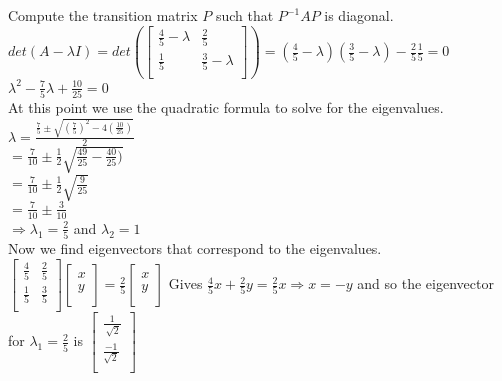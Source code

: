 \documentclass[12pt]{article}
\newenvironment{problems}{\begin{list}{}{\setlength{\labelwidth}{.7in}}}{\end{list}}
\begin{document}
\begin{problems}
 Compute the transition matrix $P$ such that $P^{-1}AP$ is diagonal.\\
 $det(A -\lambda I) = det\left(
 \begin{bmatrix}
   \frac{4}{5} - \lambda & \frac{2}{5} \\
   \frac{1}{5} & \frac{3}{5} - \lambda \\
  \end{bmatrix}\right) =
 (\frac{4}{5} - \lambda)(\frac{3}{5} - \lambda) - \frac{2}{5}\frac{1}{5} =0$\\
 $\lambda^2 -\frac{7}{5}\lambda +\frac{10}{25} = 0$\\
 At this point we use the quadratic formula to solve for the eigenvalues.\\
 $\lambda =   \frac{    \frac{7}{5}\pm \sqrt{(\frac{7}{5})^2 -4(\frac{10}{25})     }       }{  2        }$\\
  $ = \frac{7}{10} \pm \frac{1}{2}\sqrt{\frac{49}{25} -\frac{40}{25})     }       $\\
   $ = \frac{7}{10} \pm \frac{1}{2}\sqrt{\frac{9}{25}    }       $\\
      $ = \frac{7}{10} \pm \frac{3}{10}      $\\
$ \Rightarrow \lambda_1 = \frac{2}{5}$ and $\lambda_2 = 1$\\
Now we find eigenvectors that correspond to the eigenvalues.\\
$\begin{bmatrix}
   \frac{4}{5} & \frac{2}{5} \\
   \frac{1}{5} & \frac{3}{5} \\
  \end{bmatrix} 
  \begin{bmatrix}
   x\\
   y\\
  \end{bmatrix} =
  \frac{2}{5}
  \begin{bmatrix}
   x\\
   y\\
  \end{bmatrix} $
Gives $\frac{4}{5}x + \frac{2}{5}y = \frac{2}{5}x \Rightarrow x=-y$ and so the eigenvector for $\lambda_1 = \frac{2}{5}$ is $\begin{bmatrix}
   \frac{1}{\
   \sqrt{2}}\\
   \frac{-1}{\sqrt{2}}\\
  \end{bmatrix} $


\end{problems}
\end{document}
